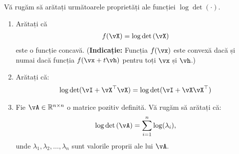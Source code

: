 \documentclass[../../book-main_ro.tex]{subfiles}
\begin{document}
\begin{exercise}
	Vă rugăm să arătați următoarele proprietăți ale funcției $\log\det(\cdot)$.
	\begin{enumerate}
		\item Arătați că
		      \begin{align*}
			      f(\vX) = \log\det\left(\vX\right)
		      \end{align*}
		      este o funcție concavă. ({\bf Indicație:} Funcția $f(\vx)$ este convexă dacă și numai dacă funcția $f(\vx+t\vh)$ pentru toți $\vx$ și $\vh$.)

		\item Arătați că:
		      \begin{align*}
			      \log\det(\vI + \vX^\top\vX) = \log\det(\vI + \vX\vX^\top)
		      \end{align*}

		\item Fie $\vA \in \R^{n\times n}$ o matrice pozitiv definită. Vă rugăm să arătați că:
		      \begin{align}
			      \log\det\left(\vA \right) = \sum_{i=1}^n \log(\lambda_i),
		      \end{align}
		      unde $\lambda_1,\lambda_2,\dots,\lambda_n$ sunt valorile proprii ale lui $\vA$.
	\end{enumerate}
\end{exercise}
\end{document}
